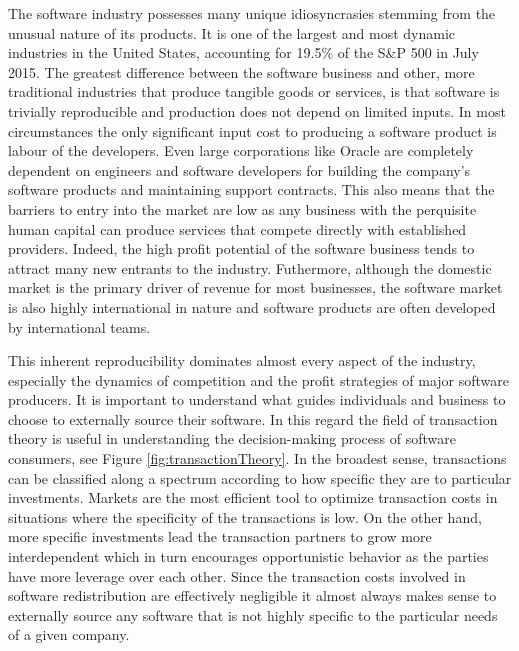 The software industry possesses many unique idiosyncrasies stemming from the unusual nature of its products.
It is one of the largest and most dynamic industries in the United States, accounting for 19.5\% of the S\&P 500 in July 2015.\autocite[6]{SurveysSoftware2015}
The greatest difference between the software business and other, more traditional industries that produce tangible goods or services, is that software is trivially reproducible and production does not depend on limited inputs.\autocite[3]{buxmann2012software}
In most circumstances the only significant input cost to producing a software product is labour of the developers.
Even large corporations like Oracle are completely dependent on engineers and software developers for building the company's software products and maintaining support contracts.\autocite[115]{finkle2012larry}
This also means that the barriers to entry into the market are low as any business with the perquisite human capital can produce services that compete directly with established providers.\autocite[115]{finkle2012larry}
Indeed, the high profit potential of the software business tends to attract many new entrants to the industry.\autocite[116]{finkle2012larry}
Futhermore, although the domestic market is the primary driver of revenue for most businesses,\autocite[]{ITSoftwareEconomist} the software market is also highly international in nature and software products are often developed by international teams.\autocite[3]{buxmann2012software}

This inherent reproducibility dominates almost every aspect of the industry, especially the dynamics of competition and the profit strategies of major software producers.
It is important to understand what guides individuals and business to choose to externally source their software.
In this regard the field of transaction theory is useful in understanding the decision-making process of software consumers, see Figure \ref{fig:transactionTheory}.
In the broadest sense, transactions can be classified along a spectrum according to how specific they are to particular investments.
Markets are the most efficient tool to optimize transaction costs in situations where the specificity of the transactions is low.
On the other hand, more specific investments lead the transaction partners to grow more interdependent which in turn encourages opportunistic behavior as the parties have more leverage over each other.\autocite[44]{buxmann2012software}
Since the transaction costs involved in software redistribution are effectively negligible it almost always makes sense to externally source any software that is not highly specific to the particular needs of a given company.

